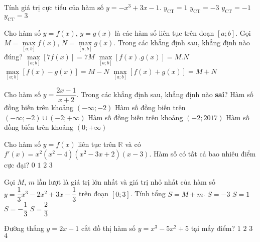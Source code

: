 \begin{ex}%
Tính giá trị cực tiểu của hàm số $y=-x^3+3x-1$.
\choice
{$y_{\text{CT}}=1$}
{\True $y_{\text{CT}}=-3$}
{$y_{\text{CT}}=-1$}
{$y_{\text{CT}}=3$} 
\end{ex}

\begin{ex}%
Cho hàm số $y=f(x)$, $y=g(x)$ là các hàm số liên tục trên đoạn $[a;b]$. Gọi $M=\max\limits_{[a;b]}f(x)$, $N=\max\limits_{[a;b]}g(x)$. Trong các khẳng định sau, khẳng định nào đúng?
\choice
{\True $\max\limits_{[a;b]}[7f(x)]=7M$}
{$\max\limits_{[a;b]}[f(x).g(x)]=M.N$}
{$\max\limits_{[a;b]}[f(x)-g(x)]=M-N$}
{$\max\limits_{[a;b]}[f(x)+g(x)]=M+N$} 
\end{ex}

\begin{ex}%
Cho hàm số $y=\dfrac{2x-1}{x+2}$. Trong các khẳng định sau, khẳng định nào \textbf{sai}?
\choice
{Hàm số đồng biến trên khoảng $(-\infty;-2)$}
{\True Hàm số đồng biến trên $(-\infty;-2)\cup (-2;+\infty)$}
{Hàm số đồng biến trên khoảng $(-2;2017)$}
{Hàm số đồng biến trên khoảng $(0;+\infty)$} 
\end{ex}

\begin{ex}%
Cho hàm số $y=f(x)$ liên tục trên $\mathbb{R}$ và có $f'(x)=x^2(x^2-4)(x^2-3x+2)(x-3)$. Hàm số có tất cả bao nhiêu điểm cực đại?
\choice
{$0$}
{\True $1$}
{$2$}
{$3$} 
\end{ex}

\begin{ex}%
Gọi $M$, $m$ lần lượt là giá trị lớn nhất và giá trị nhỏ nhất của hàm số $y=\dfrac{1}{3}x^3-2x^2+3x-\dfrac{1}{3}$ trên đoạn $[0;3]$. Tính tổng $S=M+m$.
\choice
{$S=-3$}
{$S=1$}
{$S=-\dfrac{1}{3}$}
{\True $S=\dfrac{2}{3}$}  
\end{ex}

\begin{ex}%
Đường thẳng $y=2x-1$ cắt đồ thị hàm số $y=x^3-5x^2+5$ tại mấy điểm?
\choice
{$1$}
{\True $2$}
{$3$}
{$4$} 
\end{ex}

